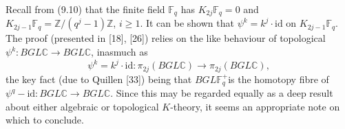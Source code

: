 \documentclass[openany,leqno]{book}  %
\newcommand{\id}{\mathrm{id}} %
\newcommand{\Z}{\mathbb{Z}}
\newcommand{\F}{\mathbb{F}}
\begin{document}
Recall from (9.10) that the finite field $\F_q$ has $K_{2j}\F_q = 0$ and $K_{2j-1}\F_q = \Z/(q^j-1)\Z$, $i \geqslant 1$.
It can be shown that $\psi^k= k^j\cdot\id$ on $K_{2j-1}\F_q$. The proof (presented in [18], [26]) relies on the
like behaviour of topological $\psi^k \colon BGL\mathbb{C} \longrightarrow BGL\mathbb{C}$, inasmuch as
\[\psi^k = k^j \cdot \id \colon \pi_{2j}(BGL\mathbb{C}) \longrightarrow \pi_{2j}(BGL\mathbb{C}),\]
the key fact (due to Quillen [33]) being that $BGL\F_q^+ $is the homotopy fibre of
$\psi^q-\id \colon BGL\mathbb{C} \longrightarrow BGL\mathbb{C}$. Since this may be regarded equally as a deep result about either algebraic or topological $K$-theory, it seems an appropriate note on which to conclude.



%
\end{document}
